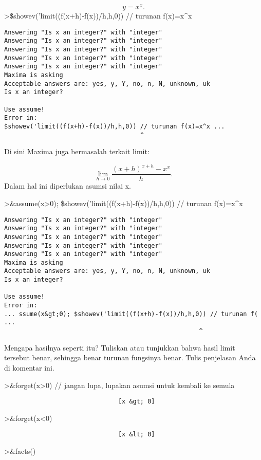 \documentclass[
]{book}
\begin{document}
\[y=x^x.\]\textgreater\$showev('limit((f(x+h)-f(x))/h,h,0)) // turunan f(x)=x\^{}x

\begin{verbatim}
Answering "Is x an integer?" with "integer"
Answering "Is x an integer?" with "integer"
Answering "Is x an integer?" with "integer"
Answering "Is x an integer?" with "integer"
Answering "Is x an integer?" with "integer"
Maxima is asking
Acceptable answers are: yes, y, Y, no, n, N, unknown, uk
Is x an integer?

Use assume!
Error in:
$showev('limit((f(x+h)-f(x))/h,h,0)) // turunan f(x)=x^x ...
                                     ^
\end{verbatim}

Di sini Maxima juga bermasalah terkait limit:

\[\lim_{h\to 0} \frac{(x+h)^{x+h}-x^x}{h}.\]Dalam hal ini diperlukan asumsi nilai x.

\textgreater\&assume(x\textgreater0); \$showev('limit((f(x+h)-f(x))/h,h,0)) // turunan f(x)=x\^{}x

\begin{verbatim}
Answering "Is x an integer?" with "integer"
Answering "Is x an integer?" with "integer"
Answering "Is x an integer?" with "integer"
Answering "Is x an integer?" with "integer"
Answering "Is x an integer?" with "integer"
Maxima is asking
Acceptable answers are: yes, y, Y, no, n, N, unknown, uk
Is x an integer?

Use assume!
Error in:
... ssume(x&gt;0); $showev('limit((f(x+h)-f(x))/h,h,0)) // turunan f( ...
                                                     ^
\end{verbatim}

Mengapa hasilnya seperti itu? Tuliskan atau tunjukkan bahwa hasil limit tersebut benar, sehingga benar turunan fungsinya benar. Tulis penjelasan Anda di komentar ini.

\textgreater\&forget(x\textgreater0) // jangan lupa, lupakan asumsi untuk kembali ke semula

\begin{verbatim}
                               [x &gt; 0]
\end{verbatim}

\textgreater\&forget(x\textless0)

\begin{verbatim}
                               [x &lt; 0]
\end{verbatim}

\textgreater\&facts()
\end{document}
